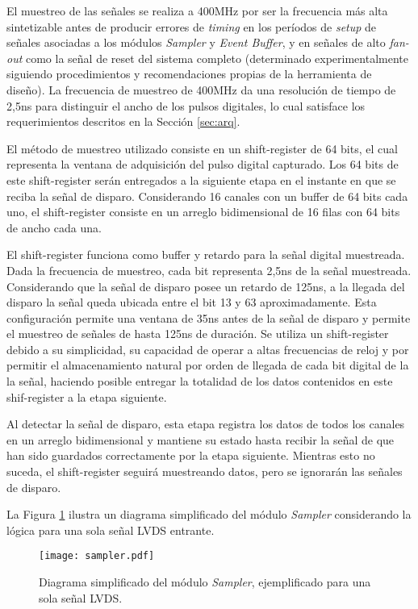 	El muestreo de las señales se realiza a 400MHz por ser la frecuencia más alta sintetizable antes de producir errores de \textit{timing} en los períodos de \textit{setup} de señales asociadas a los módulos \textit{Sampler} y \textit{Event Buffer}, y en señales de alto \textit{fan-out} como la señal de reset del sistema completo (determinado experimentalmente siguiendo procedimientos y recomendaciones propias de la herramienta de diseño). La frecuencia de muestreo de 400MHz da una resolución de tiempo de 2,5ns para distinguir el ancho de los pulsos digitales, lo cual satisface los requerimientos descritos en la Sección \ref{sec:arq}.
	
	El método de muestreo utilizado consiste en un shift-register de 64 bits, el cual representa la ventana de adquisición del pulso digital capturado. Los 64 bits de este shift-register serán entregados a la siguiente etapa en el instante en que se reciba la señal de disparo. Considerando 16 canales con un buffer de 64 bits cada uno, el shift-register consiste en un arreglo bidimensional de 16 filas con 64 bits de ancho cada una.
	
	El shift-register funciona como buffer y retardo para la señal digital muestreada. Dada la frecuencia de muestreo, cada bit representa 2,5ns de la señal muestreada. Considerando que la señal de disparo posee un retardo de 125ns, a la llegada del disparo la señal queda ubicada entre el bit 13 y 63 aproximadamente. Esta configuración permite una ventana de 35ns antes de la señal de disparo y permite el muestreo de señales de hasta 125ns de duración. Se utiliza un shift-register debido a su simplicidad, su capacidad de operar a altas frecuencias de reloj y por permitir el almacenamiento natural por orden de llegada de cada bit digital de la la señal, haciendo posible entregar la totalidad de los datos contenidos en este shif-register a la etapa siguiente.
	
	Al detectar la señal de disparo, esta etapa registra los datos de todos los canales en un arreglo bidimensional y mantiene su estado hasta recibir la señal de que han sido guardados correctamente por la etapa siguiente. Mientras esto no suceda, el shift-register seguirá muestreando datos, pero se ignorarán las señales de disparo.
	
	La Figura \ref{fig:sampler} ilustra un diagrama simplificado del módulo \textit{Sampler} considerando la lógica para una sola señal LVDS entrante.
	
	\begin{figure}[H]
		\centering
		\texttt{[image: sampler.pdf]}
		\caption{Diagrama simplificado del módulo \textit{Sampler}, ejemplificado para una sola señal LVDS.}
		\label{fig:sampler}
	\end{figure}
	
